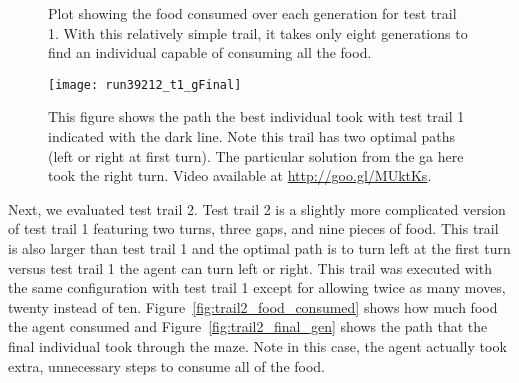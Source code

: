 \begin{figure}[ht]
\centering
{}
\caption[Food Consumed in Test Trail 1]{Plot showing the food consumed over each generation for test trail 1. With this relatively simple trail, it takes only eight generations to find an individual capable of consuming all the food.}
\label{fig:trail1_food_consumed}
\end{figure}

\begin{figure}[ht]
\centering
\texttt{[image: run39212\_t1\_gFinal]}
\caption[Individual Path in Test Trail 1]{This figure shows the path the best individual took with test trail 1 indicated with the dark line. Note this trail has two optimal paths (left or right at first turn). The particular solution from the \gls{ga} here took the right turn. Video available at \url{http://goo.gl/MUktKs}.}
\label{fig:trail1_final_gen}
\end{figure}

\clearpage
Next, we evaluated test trail 2. Test trail 2 is a slightly more complicated version of test trail 1 featuring two turns, three gaps, and nine pieces of food. This trail is also larger than test trail 1 and the optimal path is to turn left at the first turn versus test trail 1 the agent can turn left or right. This trail was executed with the same configuration with test trail 1 except for allowing twice as many moves, twenty instead of ten. Figure~\ref{fig:trail2_food_consumed} shows how much food the agent consumed and Figure~\ref{fig:trail2_final_gen} shows the path that the final individual took through the maze. Note in this case, the agent actually took extra, unnecessary steps to consume all of the food.


